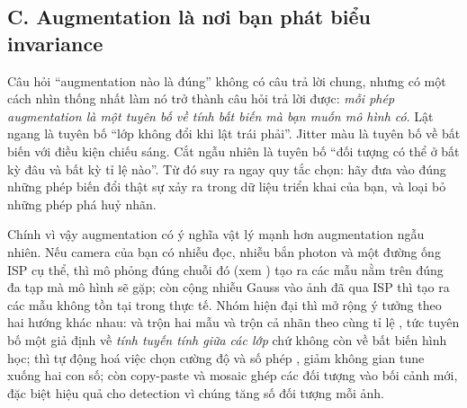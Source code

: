 \documentclass[../../../deep_learning.tex]{subfiles}
\begin{document}
\subsection{C. Augmentation là nơi bạn phát biểu invariance}
Câu hỏi ``augmentation nào là đúng'' không có câu trả lời chung, nhưng có một cách nhìn thống nhất làm nó trở thành câu hỏi trả lời được: \emph{mỗi phép augmentation là một tuyên bố về tính bất biến mà bạn muốn mô hình có}. Lật ngang là tuyên bố ``lớp không đổi khi lật trái phải''. Jitter màu là tuyên bố về bất biến với điều kiện chiếu sáng. Cắt ngẫu nhiên là tuyên bố ``đối tượng có thể ở bất kỳ đâu và bất kỳ tỉ lệ nào''. Từ đó suy ra ngay quy tắc chọn: hãy đưa vào đúng những phép biến đổi thật sự xảy ra trong dữ liệu triển khai của bạn, và loại bỏ những phép phá huỷ nhãn.

Chính vì vậy augmentation có ý nghĩa vật lý mạnh hơn augmentation ngẫu nhiên. Nếu camera của bạn có nhiễu đọc, nhiễu bắn photon và một đường ống ISP cụ thể, thì mô phỏng đúng chuỗi đó (xem ) tạo ra các mẫu nằm trên đúng đa tạp mà mô hình sẽ gặp; còn cộng nhiễu Gauss vào ảnh đã qua ISP thì tạo ra các mẫu không tồn tại trong thực tế.
 Nhóm hiện đại thì mở rộng ý tưởng theo hai hướng khác nhau:  và  trộn hai mẫu và trộn cả nhãn theo cùng tỉ lệ \cite{zhang2018mixup,yun2019cutmix}, tức tuyên bố một giả định về \emph{tính tuyến tính giữa các lớp} chứ không còn về bất biến hình học;  thì tự động hoá việc chọn cường độ và số phép \cite{cubuk2020randaugment}, giảm không gian tune xuống hai con số; còn copy-paste và mosaic ghép các đối tượng vào bối cảnh mới, đặc biệt hiệu quả cho detection vì chúng tăng số đối tượng mỗi ảnh.
\end{document}
